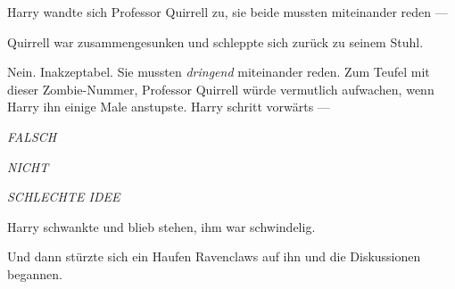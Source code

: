 Harry wandte sich Professor Quirrell zu, sie beide mussten miteinander reden —

Quirrell war zusammengesunken und schleppte sich zurück zu seinem Stuhl.

Nein. Inakzeptabel. Sie mussten \emph{dringend} miteinander reden. Zum Teufel mit dieser Zombie-Nummer, Professor Quirrell würde vermutlich aufwachen, wenn Harry ihn einige Male anstupste. Harry schritt vorwärts —

\emph{FALSCH}

\emph{NICHT}

\emph{SCHLECHTE IDEE}

Harry schwankte und blieb stehen, ihm war schwindelig.

Und dann stürzte sich ein Haufen Ravenclaws auf ihn und die Diskussionen begannen.

